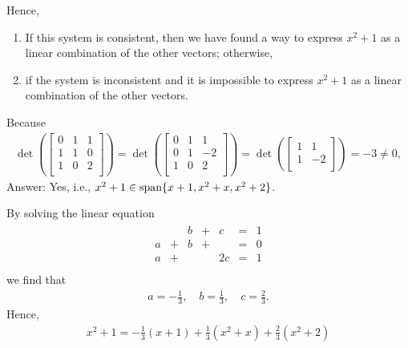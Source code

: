 \documentclass[pdf,9pt]{beamer}
\begin{document}
\begin{frame}[fragile]
\begin{solution}[continued]
  Hence,
  \begin{enumerate}
    \item If this system is consistent, then we have found a way to express
      $x^2+1$ as a linear combination of the other vectors; otherwise,
    \item if the system is inconsistent and it is impossible to express $x^2+1$
      as a linear combination of the other vectors.
  \end{enumerate}
  \bigskip
  Because
  \begin{align*}
    \det \left(
      \begin{bmatrix}
        0 & 1 & 1\\
        1 & 1 & 0\\
        1 & 0 & 2\\
      \end{bmatrix}
    \right)
    =
    \det \left(
      \begin{bmatrix}
        0 & 1 & 1\\
        0 & 1 & -2\\
        1 & 0 & 2\\
      \end{bmatrix}
    \right)
    =
    \det \left(
      \begin{bmatrix}
        1 & 1\\
        1 & -2\\
      \end{bmatrix}
    \right)
    =
    -3
    \ne 0,
  \end{align*}
  \bigskip
  Answer: Yes, i.e., $x^2+1\in\mbox{span}\{  x+1, x^2+x, x^2+2\}$.
  \myQED
\end{solution}
\end{frame}
\begin{frame}[fragile]
\begin{remark}
    By solving the linear equation 
    \begin{align*}
    \begin{array}{ccccccc}
          &   & b & + & c  & = & 1 \\
	a & + & b & + &    & = & 0 \\
	a & + &   &   & 2c & = & 1 \\
    \end{array}
    \end{align*}
    we find that 
    \begin{align*}
        a=-\frac{1}{3},\quad b= \frac{1}{3},\quad c=\frac{2}{3}.
    \end{align*}
    Hence,
    \begin{align*}
	x^2+1 = -\frac{1}{3}(x+1) +\frac{1}{3}(x^2+x)+\frac{2}{3}(x^2+2)
    \end{align*}
\end{remark}
\end{frame}
\end{document}
